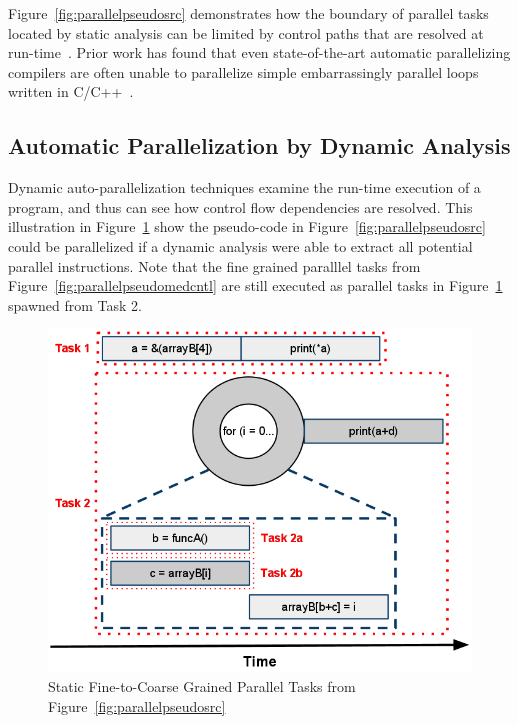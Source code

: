 \documentclass[defaultstyle,11pt]{thesis}
\begin{document}
Figure~\ref{fig:parallelpseudosrc} demonstrates how the boundary of
parallel tasks located by static analysis can be limited by control
paths that are resolved at run-time~\cite{blume:1992:pds}.  Prior work
has found that even state-of-the-art automatic parallelizing compilers
are often unable to parallelize simple embarrassingly parallel loops
written in C/C++~\cite{minjang:10:micro}.

\subsection{Automatic Parallelization by Dynamic Analysis}

Dynamic auto-parallelization techniques examine the run-time execution
of a program, and thus can see how control flow dependencies are
resolved. This illustration in Figure~\ref{fig:parallelpseudocoarse}
show the pseudo-code in Figure~\ref{fig:parallelpseudosrc} could be
parallelized if a dynamic analysis were able to extract all potential
parallel instructions.  Note that the fine grained paralllel tasks
from Figure~\ref{fig:parallelpseudomedcntl} are still executed as
parallel tasks in Figure~\ref{fig:parallelpseudocoarse} spawned from
Task 2.

\begin{figure}
\begin{center}
\includegraphics[width=5in]{images/ParallelTasksCoarse}
\end{center}
\caption{Static Fine-to-Coarse Grained Parallel Tasks from Figure~\ref{fig:parallelpseudosrc}}
\label{fig:parallelpseudocoarse}
\end{figure}
\end{document}
